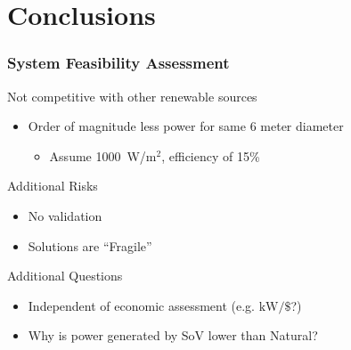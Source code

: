 \documentclass[mathserif]{beamer}
\begin{document}
%
%
\section{Conclusions}
\begin{frame}
 \frametitle{System Feasibility Assessment}

 \begin{block}{Not competitive with other renewable sources}
 \begin{itemize}
 \item Order of magnitude less power for same 6 meter diameter
 \begin{itemize}
   \item Assume 1000~W/$\text{m}^2$, efficiency of 15\%
 \end{itemize}
 \end{itemize}
 \end{block}


 \begin{block}{Additional Risks}
 \begin{itemize}
 \item No validation
 \item Solutions are ``Fragile''
 \end{itemize}
 \end{block}

 \begin{block}{Additional Questions}
 \begin{itemize}
 \item Independent of economic assessment (e.g. $\text{kW}/\$$?)
 \item Why is power generated by SoV lower than Natural?
 \end{itemize}
 \end{block}


\end{frame}
\end{document}
